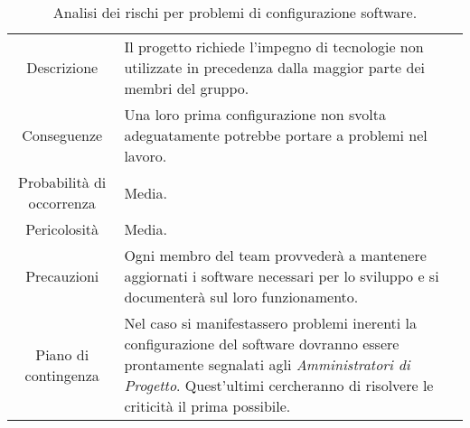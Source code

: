 \begin{table} [H]
    \begin{tabular}{|c|p{10cm}|}
    \rowcolor{darkblue} \hline
    \multicolumn{2}{|c|}{\textcolor{white}{\textbf{RT4 - Problemi nella configurazione software}}}\\ \hline
    Descrizione & Il progetto richiede l'impegno di tecnologie non utilizzate in precedenza dalla maggior parte dei membri del gruppo.\\ \hline
    Conseguenze & Una loro prima configurazione non svolta adeguatamente potrebbe portare a problemi nel lavoro.\\ \hline
    Probabilità di occorrenza & Media.\\ \hline
    Pericolosità & Media.\\ \hline
    Precauzioni & Ogni membro del team provvederà a mantenere aggiornati i software necessari per lo sviluppo e si documenterà sul loro funzionamento.\\ \hline
    Piano di contingenza & Nel caso si manifestassero problemi inerenti la configurazione del software dovranno essere prontamente segnalati agli \textit{Amministratori di Progetto}. Quest'ultimi cercheranno di risolvere le criticità il prima possibile.\\ \hline
    \end{tabular}
    \caption{\label{tab:RT4}Analisi dei rischi per problemi di configurazione software.}
\end{table}